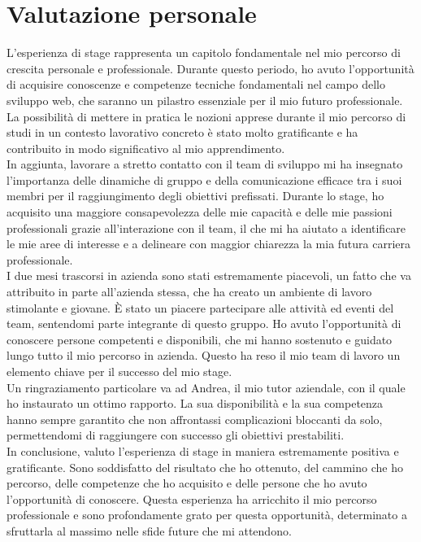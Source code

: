 \section{Valutazione personale}\label{sec:valutazione-personale}

L'esperienza di stage rappresenta un capitolo fondamentale nel mio percorso di crescita personale e professionale. Durante questo periodo, ho avuto l'opportunità di acquisire conoscenze e competenze tecniche 
fondamentali nel campo dello sviluppo web, che saranno un pilastro essenziale per il mio futuro professionale. La possibilità di mettere in pratica le nozioni apprese durante il mio percorso di studi in un contesto
lavorativo concreto è stato molto gratificante e ha contribuito in modo significativo al mio apprendimento.\\
In aggiunta, lavorare a stretto contatto con il team di sviluppo mi ha insegnato l'importanza delle dinamiche di gruppo e della comunicazione efficace tra i suoi membri per il raggiungimento degli obiettivi prefissati.
Durante lo stage, ho acquisito una maggiore consapevolezza delle mie capacità e delle mie passioni professionali grazie all'interazione con il team, il che mi ha aiutato a identificare le mie aree di interesse e a delineare con maggior chiarezza la mia futura carriera professionale.\\
I due mesi trascorsi in azienda sono stati estremamente piacevoli, un fatto che va attribuito in parte all'azienda stessa, che ha creato un ambiente di lavoro stimolante e giovane.
È stato un piacere partecipare alle attività ed eventi del team, sentendomi parte integrante di questo gruppo. Ho avuto l'opportunità di conoscere persone competenti e disponibili, che mi hanno sostenuto e guidato 
lungo tutto il mio percorso in azienda. Questo ha reso il mio team di lavoro un elemento chiave per il successo del mio stage.\\
Un ringraziamento particolare va ad Andrea, il mio tutor aziendale, con il quale ho instaurato un ottimo rapporto. La sua disponibilità e la sua competenza hanno sempre garantito che non affrontassi complicazioni bloccanti da solo, 
permettendomi di raggiungere con successo gli obiettivi prestabiliti.\\

In conclusione, valuto l'esperienza di stage in maniera estremamente positiva e gratificante. Sono soddisfatto del risultato che ho ottenuto, del cammino che ho percorso, delle competenze 
che ho acquisito e delle persone che ho avuto l'opportunità di conoscere. Questa esperienza ha arricchito il mio percorso professionale e sono profondamente grato per questa opportunità, 
determinato a sfruttarla al massimo nelle sfide future che mi attendono.